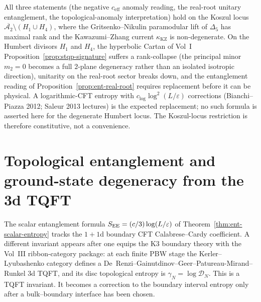 \begin{remark}
\label{rem:ent-koszul-locus}
All three statements (the negative
$c_{\mathrm{eff}}$ anomaly reading, the real-root unitary entanglement,
the topological-anomaly interpretation) hold on the
Koszul locus
$\overline{\mathcal A_2}\setminus(H_1\cup H_4)$, where the
Gritsenko--Nikulin paramodular lift of $\Delta_5$ has maximal rank
and the Kawazumi--Zhang current $\kappa_{\mathrm{KZ}}$ is
non-degenerate. On the Humbert divisors $H_1$ and $H_4$, the
hyperbolic Cartan of Vol~I
Proposition~\ref{prop:stqp-signature} suffers a
rank-collapse (the principal minor $m_2 = 0$ becomes a full
$2$-plane degeneracy rather than an isolated isotropic
direction), unitarity on the real-root sector breaks down, and
the entanglement reading of
Proposition~\ref{prop:ent-real-root} requires
replacement before it can be physical.  A logarithmic-CFT entropy
with
$c_{\mathrm{log}}\log^2(L/\varepsilon)$ corrections
(Bianchi--Piazza 2012; Saleur 2013 lectures) is the expected
replacement; no such formula is asserted here for the degenerate
Humbert locus.  The Koszul-locus restriction is therefore
constitutive, not a convenience.
\end{remark}

\section{Topological entanglement and ground-state degeneracy from the 3d TQFT}
\label{sec:ent-3d-tqft}

The scalar entanglement formula
$S_{\mathrm{EE}} = (c/3)\log(L/\varepsilon)$ of
Theorem~\ref{thm:ent-scalar-entropy} tracks the $1+1$d boundary CFT
Calabrese--Cardy coefficient.  A different invariant appears after
one equips the K3 boundary theory with the Vol~III ribbon-category
package: at each finite PBW stage the Kerler--Lyubashenko category
defines a De~Renzi--Gainutdinov--Geer--Patureau-Mirand--Runkel
3d TQFT, and its disc topological entropy is
$\gamma_N=\log\mathcal D_N$.  This is a TQFT invariant.  It becomes
a correction to the boundary interval entropy only after a
bulk--boundary interface has been chosen.

